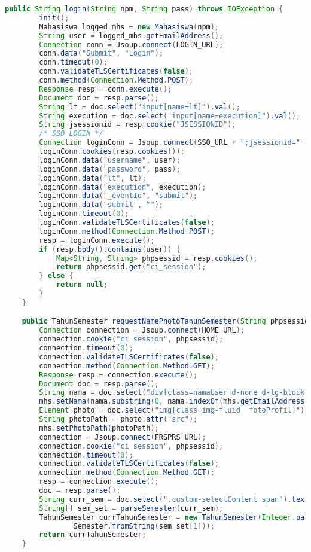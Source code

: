 \begin{lstlisting}[language=Java,basicstyle=\tiny,caption=Scraper.java]
	public String login(String npm, String pass) throws IOException {
		init();
		Mahasiswa logged_mhs = new Mahasiswa(npm);
		String user = logged_mhs.getEmailAddress();
		Connection conn = Jsoup.connect(LOGIN_URL);
		conn.data("Submit", "Login");
		conn.timeout(0);
		conn.validateTLSCertificates(false);
		conn.method(Connection.Method.POST);
		Response resp = conn.execute();
		Document doc = resp.parse();
		String lt = doc.select("input[name=lt]").val();
		String execution = doc.select("input[name=execution]").val();
		String jsessionid = resp.cookie("JSESSIONID");
		/* SSO LOGIN */
		Connection loginConn = Jsoup.connect(SSO_URL + ";jsessionid=" + jsessionid + "?service=" + LOGIN_URL);
		loginConn.cookies(resp.cookies());
		loginConn.data("username", user);
		loginConn.data("password", pass);
		loginConn.data("lt", lt);
		loginConn.data("execution", execution);
		loginConn.data("_eventId", "submit");
		loginConn.data("submit", "");
		loginConn.timeout(0);
		loginConn.validateTLSCertificates(false);
		loginConn.method(Connection.Method.POST);
		resp = loginConn.execute();
		if (resp.body().contains(user)) {
			Map<String, String> phpsessid = resp.cookies();
			return phpsessid.get("ci_session");
		} else {
			return null;
		}
	}

	public TahunSemester requestNamePhotoTahunSemester(String phpsessid, Mahasiswa mhs) throws IOException {
		Connection connection = Jsoup.connect(HOME_URL);
		connection.cookie("ci_session", phpsessid);
		connection.timeout(0);
		connection.validateTLSCertificates(false);
		connection.method(Connection.Method.GET);
		Response resp = connection.execute();
		Document doc = resp.parse();
		String nama = doc.select("div[class=namaUser d-none d-lg-block mr-3]").text();
		mhs.setNama(nama.substring(0, nama.indexOf(mhs.getEmailAddress())));
		Element photo = doc.select("img[class=img-fluid  fotoProfil]").first();
		String photoPath = photo.attr("src");
		mhs.setPhotoPath(photoPath);
		connection = Jsoup.connect(FRSPRS_URL);
		connection.cookie("ci_session", phpsessid);
		connection.timeout(0);
		connection.validateTLSCertificates(false);
		connection.method(Connection.Method.GET);
		resp = connection.execute();
		doc = resp.parse();
		String curr_sem = doc.select(".custom-selectContent span").text();
		String[] sem_set = parseSemester(curr_sem);
		TahunSemester currTahunSemester = new TahunSemester(Integer.parseInt(sem_set[0]),
				Semester.fromString(sem_set[1]));
		return currTahunSemester;
	}


\end{lstlisting}
